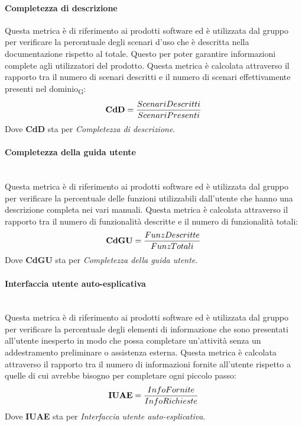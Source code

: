 \paragraph{Completezza di descrizione}\mbox\\
Questa metrica è di riferimento ai prodotti software ed è utilizzata dal gruppo per verificare la percentuale degli scenari d’uso che è descritta nella documentazione rispetto al totale. Questo per poter garantire informazioni complete agli utilizzatori del prodotto. Questa metrica è calcolata attraverso il rapporto tra il numero di scenari descritti e il numero di scenari effettivamente presenti nel dominio\textsubscript{G}:
\begin{align*}
	\centering
	\textbf{CdD} = \frac{ScenariDescritti}{ScenariPresenti}
\end{align*}
Dove \textbf{CdD} sta per \textit{Completezza di descrizione}.
\paragraph{Completezza della guida utente}\mbox{}\\
Questa metrica è di riferimento ai prodotti software ed è utilizzata dal gruppo per verificare la percentuale delle funzioni utilizzabili dall'utente che hanno una descrizione completa nei vari manuali. Questa metrica è calcolata attraverso il rapporto tra il numero di funzionalità descritte e il numero di funzionalità totali:
\begin{align*}
	\centering
	\textbf{CdGU} = \frac{FunzDescritte}{FunzTotali}
\end{align*}
Dove \textbf{CdGU} sta per \textit{Completezza della guida utente}.
\paragraph{Interfaccia utente auto-esplicativa}\mbox{}\\
Questa metrica è di riferimento ai prodotti software ed è utilizzata dal gruppo per verificare la percentuale degli elementi di informazione che sono presentati all’utente inesperto in modo che possa completare un’attività senza un addestramento preliminare o assistenza esterna. Questa metrica è calcolata attraverso il rapporto tra il numero di informazioni fornite all'utente rispetto a quelle di cui avrebbe bisogno per completare ogni piccolo passo:
\begin{align*}
	\centering
	\textbf{IUAE} = \frac{InfoFornite}{InfoRichieste}
\end{align*}
Dove \textbf{IUAE} sta per \textit{Interfaccia utente auto-esplicativa}.
